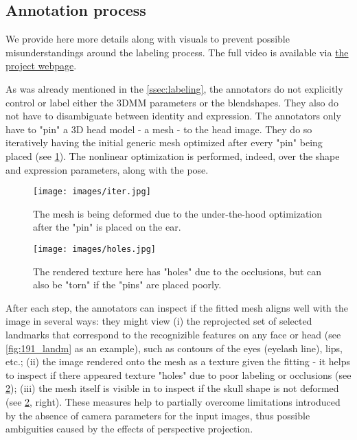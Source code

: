 \documentclass[10pt,twocolumn,letterpaper]{article}
\begin{document}
\subsection{Annotation process}\label{ssec:annotation_process_detailed}

We provide here more details along with visuals to prevent possible misunderstandings around the labeling process. The full video is available via \href{https://p.farm/research/dad-3dheads}{the project webpage}.

As was already mentioned in the \cref{ssec:labeling}, the annotators do not explicitly control or label either the 3DMM parameters or the blendshapes. 
They also do not have to disambiguate between identity and expression.
The annotators only have to "pin" a 3D head model - a mesh - to the head image.
They do so iteratively having the initial generic mesh optimized after every "pin" being placed (see \cref{fig:iteration}).
The nonlinear optimization is performed, indeed, over the shape and expression parameters, along with the pose.
\begin{figure}[h!]
     \centering
      \texttt{[image: images/iter.jpg]}
     \caption{The mesh is being deformed due to the under-the-hood optimization after the "pin" is placed on the ear.}
     \label{fig:iteration}
\end{figure}
\begin{figure}[h!]
     \centering
      \texttt{[image: images/holes.jpg]}
     \caption{The rendered texture here has "holes" due to the occlusions, but can also be "torn" if the "pins" are placed poorly.}
     \label{fig:holes}
\end{figure}

After each step, the annotators can inspect if the fitted mesh aligns well with the image in several ways: they might view (i) the reprojected set of selected landmarks that correspond to the recognizible features on any face or head (see \cref{fig:191_landm} as an example), such as contours of the eyes (eyelash line), lips, etc.; (ii) the image rendered onto the mesh as a texture given the fitting - it helps to inspect if there appeared texture "holes" due to poor labeling or occlusions (see \cref{fig:holes}); (iii) the mesh itself is visible in  to inspect if the skull shape is not deformed (see \cref{fig:holes}, right).
These measures help to partially overcome limitations introduced by the absence of camera parameters for the input images, thus possible ambiguities caused by the effects of perspective projection.
\end{document}
